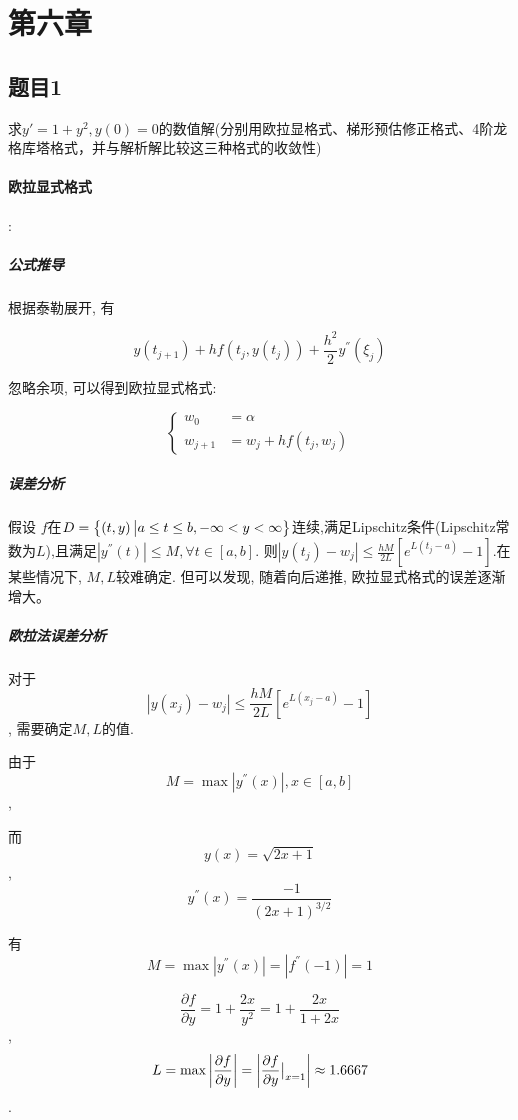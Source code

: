 \section{第六章}

\subsection{题目1}

求$y'=1+y^2,y(0)=0$的数值解(分别用欧拉显格式、梯形预估修正格式、4阶龙格库塔格式，并与解析解比较这三种格式的收敛性)

\paragraph{欧拉显式格式}:
\subparagraph{公式推导}
根据泰勒展开, 有

$$y\left(t_{j+1}\right) + hf\left(t_j,y\left(t_j\right)\right) + \frac{h^2}{2}y^{''}\left(\xi_j\right)$$

忽略余项, 可以得到欧拉显式格式:

$$\left\{
\begin{aligned}
w_0 &= \alpha \\
w_{j+1} &= w_j + hf\left(t_j,w_j\right)
\end{aligned}
\right.$$

\subparagraph{误差分析}

假设 $f$在$D = \left\{\left(t,y\right) \big{|} a \leq t \leq b,-\infty < y < \infty \right\}$连续,满足Lipschitz条件(Lipschitz常数为$L$),且满足$\left|y^{''}\left(t\right) \right| \leq M,\forall t\in \left[a,b\right]$. 则$\left|y\left(t_j\right) - w_j \right| \leq \frac{hM}{2L}\left[ e^{L\left(t_j-a\right)}-1\right]$.在某些情况下, $M,L$较难确定. 但可以发现, 随着向后递推, 欧拉显式格式的误差逐渐增大。

\subparagraph{欧拉法误差分析}

对于$$\left|y\left(x_j\right) - w_j \right| \leq \frac{hM}{2L}\left[ e^{L\left(x_j-a\right)}-1\right]$$, 需要确定$M,L$的值.

由于$$M = \max \left|y^{''}\left(x\right) \right|,x\in \left[a,b\right]$$,

而$$y\left(x\right) = \sqrt{2x+1}$$,$$y^{''}\left(x\right) = \frac{-1}{\left(2x+1\right)^{3/2}}$$

有$$M = \max \left|y^{''}\left(x\right) \right| = \left|f^{''}\left(-1\right)\right| = 1$$

$$ \frac{\partial f}{\partial y} = 1+\frac{2x}{y^2} = 1+\frac{2x}{1+2x}$$, $$L = \max \left|\frac{\partial f}{\partial y} \right| = \left|\frac{\partial f}{\partial y} \big{|}_{x=1} \right| \approx 1.6667$$.

